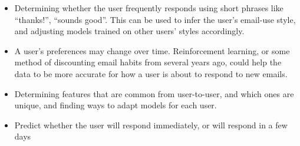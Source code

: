 \documentclass{article}
\begin{document}
\begin{itemize}
\item Determining whether the user frequently responds using short phrases like ``thanks!'', ``sounds good''. This can be used to infer the user's email-use style, and adjusting models trained on other users' styles accordingly.
\item A user's preferences may change over time. Reinforcement learning, or some method of discounting email habits from several years ago, could help the data to be more accurate for how a user is about to respond to new emails.
\item Determining features that are common from user-to-user, and which ones are unique, and finding ways to adapt models for each user.
\item Predict whether the user will respond immediately, or will respond in a few days
\end{itemize}

 

\end{document}
